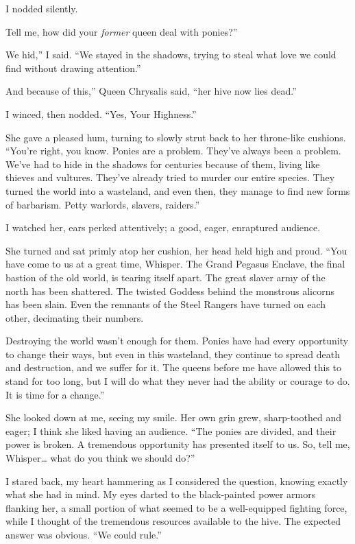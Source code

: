 I nodded silently.

\leavevmode{}Tell me, how did your \textit{former} queen deal with ponies?”

\leavevmode{}We hid,” I said. “We stayed in the shadows, trying to steal what love we could find without drawing attention.”

\leavevmode{}And because of this,” Queen Chrysalis said, “her hive now lies dead.”

I winced, then nodded. “Yes, Your Highness.”

She gave a pleased hum, turning to slowly strut back to her throne-like cushions. “You’re right, you know. Ponies are a problem. They’ve always been a problem. We’ve had to hide in the shadows for centuries because of them, living like thieves and vultures. They’ve already tried to murder our entire species. They turned the world into a wasteland, and even then, they manage to find new forms of barbarism. Petty warlords, slavers, raiders.”

I watched her, ears perked attentively; a good, eager, enraptured audience.

She turned and sat primly atop her cushion, her head held high and proud. “You have come to us at a great time, Whisper. The Grand Pegasus Enclave, the final bastion of the old world, is tearing itself apart. The great slaver army of the north has been shattered. The twisted Goddess behind the monstrous alicorns has been slain. Even the remnants of the Steel Rangers have turned on each other, decimating their numbers.

\leavevmode{}Destroying the world wasn’t enough for them. Ponies have had every opportunity to change their ways, but even in this wasteland, they continue to spread death and destruction, and we suffer for it. The queens before me have allowed this to stand for too long, but I will do what they never had the ability or courage to do. It is time for a change.”

She looked down at me, seeing my smile. Her own grin grew, sharp-toothed and eager; I think she liked having an audience. “The ponies are divided, and their power is broken. A tremendous opportunity has presented itself to us. So, tell me, Whisper… what do you think we should do?”

I stared back, my heart hammering as I considered the question, knowing exactly what she had in mind. My eyes darted to the black-painted power armors flanking her, a small portion of what seemed to be a well-equipped fighting force, while I thought of the tremendous resources available to the hive. The expected answer was obvious. “We could rule.”

